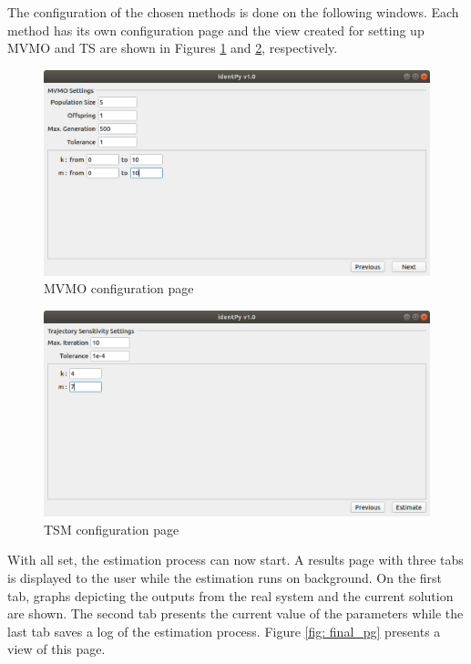 The configuration of the chosen methods is done on the following windows. Each method has its own configuration page and the view created for setting up MVMO and TS are shown in Figures \ref{fig: MVMO_page} and \ref{fig: TS_page}, respectively.

\begin{figure}[!h]
	\caption{MVMO configuration page}
	\begin{center}
		\includegraphics[scale=.5]{Images/Software_MVMO_page.eps}
	\end{center}
	\label{fig: MVMO_page}
\end{figure}

\begin{figure}[!h]
	\caption{TSM configuration page}
	\begin{center}
		\includegraphics[scale=.5]{Images/Software_TS_page.eps}
	\end{center}
	\label{fig: TS_page}
\end{figure}

With all set, the estimation process can now start. A results page with three tabs is displayed to the user while the estimation runs on background. On the first tab, graphs depicting the outputs from the real system and the current solution are shown. The second tab presents the current value of the parameters while the last tab saves a log of the estimation process. Figure \ref{fig: final_pg} presents a view of this page.

